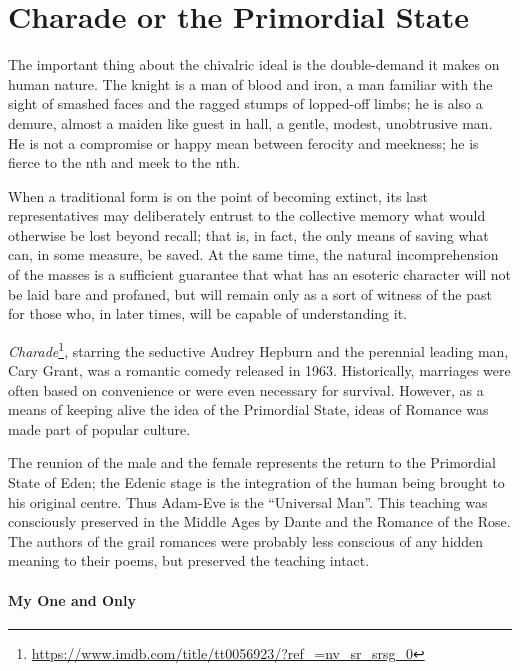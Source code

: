 \section{Charade or the Primordial State}

\begin{quotex}
The important thing about the chivalric ideal is the double-demand it makes on human nature. The knight is a man of blood and iron, a man familiar with the sight of smashed faces and the ragged stumps of lopped-off limbs; he is also a demure, almost a maiden like guest in hall, a gentle, modest, unobtrusive man. He is not a compromise or happy mean between ferocity and meekness; he is fierce to the nth and meek to the nth.

When a traditional form is on the point of becoming extinct, its last representatives may deliberately entrust to the collective memory what would otherwise be lost beyond recall; that is, in fact, the only means of saving what can, in some measure, be saved. At the same time, the natural incomprehension of the masses is a sufficient guarantee that what has an esoteric character will not be laid bare and profaned, but will remain only as a sort of witness of the past for those who, in later times, will be capable of understanding it.
\end{quotex}



\emph{Charade}\footnote{\url{https://www.imdb.com/title/tt0056923/?ref\_=nv\_sr\_srsg\_0}}, starring the seductive Audrey Hepburn and the perennial leading man, Cary Grant, was a romantic comedy released in 1963. Historically, marriages were often based on convenience or were even necessary for survival. However, as a means of keeping alive the idea of the Primordial State, ideas of Romance was made part of popular culture.

The reunion of the male and the female represents the return to the Primordial State of Eden; the Edenic stage is the integration of the human being brought to his original centre. Thus Adam-Eve is the ``Universal Man''. This teaching was consciously preserved in the Middle Ages by Dante and the Romance of the Rose. The authors of the grail romances were probably less conscious of any hidden meaning to their poems, but preserved the teaching intact.

\paragraph{My One and Only}


